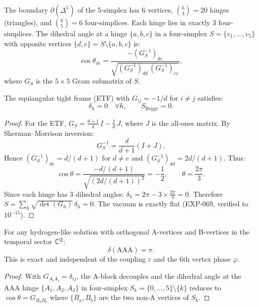 \begin{remark}
The boundary $\partial(\Delta^5)$ of the 5-simplex has 6 vertices, $\binom{6}{3}=20$ hinges (triangles), and $\binom{6}{5}=6$ four-simplices.  Each hinge lies in exactly 3 four-simplices.  The dihedral angle at a hinge $\{a,b,c\}$ in a four-simplex $S = \{v_1,\ldots,v_5\}$ with opposite vertices $\{d,e\} = S \setminus \{a,b,c\}$ is:
\begin{equation}
\cos\theta_{de} = \frac{-(G^{-1}_S)_{de}}{\sqrt{(G^{-1}_S)_{dd}\,(G^{-1}_S)_{ee}}},
\end{equation}
where $G_S$ is the $5 \times 5$ Gram submatrix of $S$.

\begin{theorem}
\label{thm:flat_vacuum}
The equiangular tight frame (ETF) with $G_{ij} = -1/d$ for $i \ne j$ satisfies:
\begin{equation}
\delta_h = 0 \quad \forall h, \qquad S_{\mathrm{Regge}} = 0.
\end{equation}
\end{theorem}
\begin{proof}
For the ETF, $G_S = \frac{d+1}{d}\,I - \frac{1}{d}\,J$, where $J$ is the all-ones matrix.  By Sherman--Morrison inversion:
\begin{equation}
G_S^{-1} = \frac{d}{d+1}(I + J).
\end{equation}
Hence $(G^{-1}_S)_{de} = d/(d+1)$ for $d \ne e$ and $(G^{-1}_S)_{dd} = 2d/(d+1)$.  Thus:
\begin{equation}
\cos\theta = \frac{-d/(d+1)}{\sqrt{(2d/(d+1))^2}} = -\frac{1}{2}, \qquad \theta = \frac{2\pi}{3}.
\end{equation}
Since each hinge has 3 dihedral angles: $\delta_h = 2\pi - 3 \times \frac{2\pi}{3} = 0$.  Therefore $S = \sum_h \sqrt{\det(G_h)}\,\delta_h = 0$.  The vacuum is exactly flat (EXP-069, verified to $10^{-15}$).
\end{proof}

\begin{theorem}
\label{thm:delta_AAA}
For any hydrogen-like solution with orthogonal A-vertices and B-vertices in the temporal sector $\mathbb{C}^2$:
\begin{equation}
\boxed{\delta(\mathrm{AAA}) = \pi.}
\end{equation}
This is exact and independent of the coupling $\varepsilon$ and the 6th vertex phase $\varphi$.
\end{theorem}
\begin{proof}
With $G_{A_i A_j} = \delta_{ij}$, the A-block decouples and the dihedral angle at the AAA hinge $\{A_1,A_2,A_3\}$ in four-simplex $S_k = \{0,\ldots,5\}\setminus\{k\}$ reduces to $\cos\theta = G_{B_a B_b}$ where $\{B_a,B_b\}$ are the two non-A vertices of $S_k$.


\end{proof}
\end{remark}
